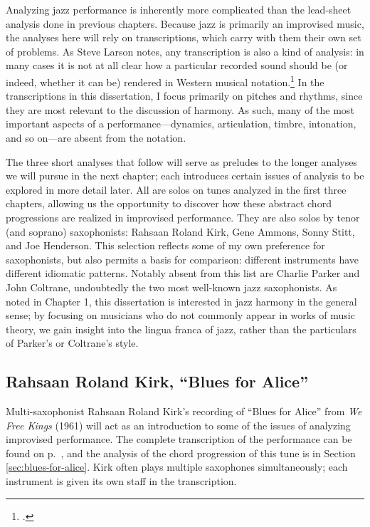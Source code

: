 Analyzing jazz performance is inherently more complicated than the
lead-sheet analysis done in previous chapters. Because jazz is primarily an
improvised music, the analyses here will rely on transcriptions, which carry
with them their own set of problems. As Steve Larson notes, any
transcription is also a kind of analysis: in many cases it is not at all clear
how a particular recorded sound should be (or indeed, whether it can be)
rendered in Western musical notation.\footcite[1--2]{larson:2009} In the
transcriptions in this dissertation, I focus primarily on pitches and rhythms,
since they are most relevant to the discussion of harmony. As such, many
of the most important aspects of a performance---dynamics, articulation,
timbre, intonation, and so on---are absent from the notation.

The three short analyses that follow will serve as preludes to the longer
analyses we will pursue in the next chapter; each introduces
certain issues of analysis to be explored in more detail later. All are
solos on tunes analyzed in the first three chapters, allowing us the
opportunity to discover how these abstract chord progressions are realized in
improvised performance. They are also solos by tenor (and soprano)
saxophonists: Rahsaan Roland Kirk, Gene Ammons, Sonny Stitt, and Joe
Henderson. This selection reflects some of my own preference for saxophonists,
but also permits a basis for comparison: different instruments have
different idiomatic patterns. Notably absent from this list are Charlie Parker
and John Coltrane, undoubtedly the two most well-known jazz saxophonists. As noted in
Chapter 1, this dissertation is interested in jazz harmony in the general
sense; by focusing on musicians who do not commonly appear in works of music
theory, we gain insight into the lingua franca of jazz, rather than the
particulars of Parker's or Coltrane's style.

\subsection{Rahsaan Roland Kirk, “Blues for Alice”}
\label{subsec:kirk-blues-for-alice}

Multi-saxophonist Rahsaan Roland Kirk's recording of ``Blues for Alice'' from
\emph{We Free Kings} (1961) will act as an introduction to some of the issues
of analyzing improvised performance. The complete transcription of the
performance can be found on p.~\pageref{transcription:blues-for-alice}, and
the analysis of the chord progression of this tune is in Section
\ref{sec:blues-for-alice}. Kirk often plays multiple saxophones
simultaneously; each instrument is given its own staff in the transcription.

